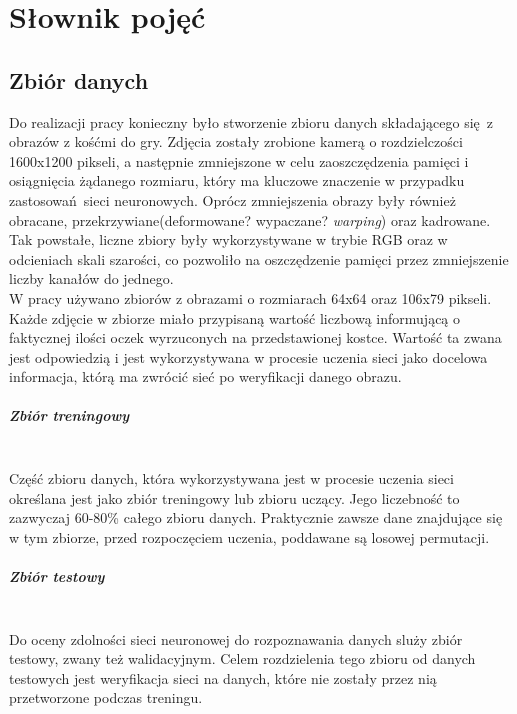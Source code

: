 
\chapter{Słownik pojęć}
\section{Zbiór danych}
Do realizacji pracy konieczny było stworzenie zbioru danych składającego się z obrazów
z kośćmi do gry. Zdjęcia zostały zrobione kamerą o rozdzielczości 1600x1200 pikseli,
a następnie zmniejszone w celu zaoszczędzenia pamięci i osiągnięcia żądanego rozmiaru,
który ma kluczowe znaczenie w przypadku zastosowań sieci neuronowych.
Oprócz zmniejszenia obrazy były również obracane, przekrzywiane(deformowane? wypaczane? \textit{warping}) oraz kadrowane.
Tak powstałe, liczne zbiory były wykorzystywane w trybie RGB oraz w odcieniach skali szarości,
co pozwoliło na oszczędzenie pamięci przez zmniejszenie liczby kanałów do jednego.\\
W pracy używano zbiorów z obrazami o rozmiarach 64x64 oraz 106x79 pikseli. Każde zdjęcie
w zbiorze miało przypisaną wartość liczbową informującą o faktycznej ilości oczek wyrzuconych
na przedstawionej kostce. Wartość ta zwana jest odpowiedzią i jest wykorzystywana w
procesie uczenia sieci jako docelowa informacja, którą ma zwrócić sieć po weryfikacji danego obrazu.

\paragraph{Zbiór treningowy} \mbox{}\\
Część zbioru danych, która wykorzystywana jest w procesie uczenia sieci określana jest jako zbiór
treningowy lub zbioru uczący. Jego liczebność to zazwyczaj 60-80\% całego zbioru danych.
Praktycznie zawsze dane znajdujące się w tym zbiorze, przed rozpoczęciem uczenia,
poddawane są losowej permutacji.

\paragraph{Zbiór testowy} \mbox{}\\
Do oceny zdolności sieci neuronowej do rozpoznawania danych sluży zbiór testowy, zwany
też walidacyjnym. Celem rozdzielenia tego zbioru od danych testowych jest weryfikacja
sieci na danych, które nie zostały przez nią przetworzone podczas treningu.

